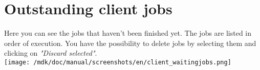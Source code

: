 \section{Outstanding client jobs}Here you can see the jobs that haven't been finished yet. The jobs are listed in order of execution. You have the possibility to delete jobs by selecting them and clicking on \textit{"Discard selected"}.\\
\texttt{[image: /mdk/doc/manual/screenshots/en/client\_waitingjobs.png]} \\
